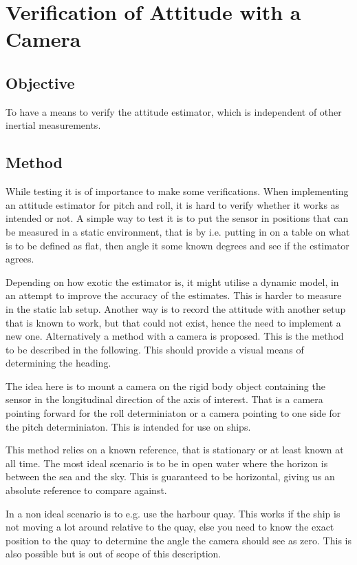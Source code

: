 \chapter{Verification of Attitude with a Camera}

\section{Objective}
To have a means to verify the attitude estimator, which is independent
of other inertial measurements.

\section{Method}
While testing it is of importance to make some verifications. When
implementing an attitude estimator for pitch and roll, it is hard to
verify whether it works as intended or not. A simple way to test it is
to put the sensor in positions that can be measured in a static
environment, that is by i.e. putting in on a table on what is to be
defined as flat, then angle it some known degrees and see if the
estimator agrees.

Depending on how exotic the estimator is, it might utilise a dynamic
model, in an attempt to improve the accuracy of the estimates. This is
harder to measure in the static lab setup. Another way is to record
the attitude with another setup that is known to work, but that could
not exist, hence the need to implement a new one. Alternatively a
method with a camera is proposed. This is the method to be described
in the following. This should provide a visual means of determining
the heading.

The idea here is to mount a camera on the rigid body object containing
the sensor in the longitudinal direction of the axis of interest. That
is a camera pointing forward for the roll determiniaton or a camera
pointing to one side for the pitch determiniaton. This is intended for
use on ships.

This method relies on a known reference, that is stationary or at least
known at all time. The most ideal scenario is to be in open water
where the horizon is between the sea and the sky. This is guaranteed
to be horizontal, giving us an absolute reference to compare against.

In a non ideal scenario is to e.g. use the harbour quay. This works if
the ship is not moving a lot around relative to the quay, else you
need to know the exact position to the quay to determine the angle the
camera should see as zero. This is also possible but is out of scope
of this description.

